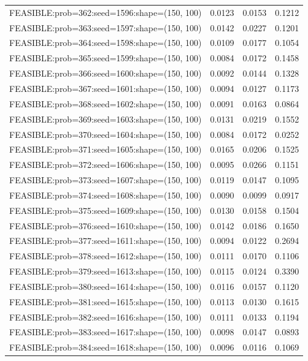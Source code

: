 \begin{longtable}{lccc}
FEASIBLE:prob=362:seed=1596:shape=(150, 100) & 0.0123 & 0.0153 & 0.1212 \\
FEASIBLE:prob=363:seed=1597:shape=(150, 100) & 0.0142 & 0.0227 & 0.1201 \\
FEASIBLE:prob=364:seed=1598:shape=(150, 100) & 0.0109 & 0.0177 & 0.1054 \\
FEASIBLE:prob=365:seed=1599:shape=(150, 100) & 0.0084 & 0.0172 & 0.1458 \\
FEASIBLE:prob=366:seed=1600:shape=(150, 100) & 0.0092 & 0.0144 & 0.1328 \\
FEASIBLE:prob=367:seed=1601:shape=(150, 100) & 0.0094 & 0.0127 & 0.1173 \\
FEASIBLE:prob=368:seed=1602:shape=(150, 100) & 0.0091 & 0.0163 & 0.0864 \\
FEASIBLE:prob=369:seed=1603:shape=(150, 100) & 0.0131 & 0.0219 & 0.1552 \\
FEASIBLE:prob=370:seed=1604:shape=(150, 100) & 0.0084 & 0.0172 & 0.0252 \\
FEASIBLE:prob=371:seed=1605:shape=(150, 100) & 0.0165 & 0.0206 & 0.1525 \\
FEASIBLE:prob=372:seed=1606:shape=(150, 100) & 0.0095 & 0.0266 & 0.1151 \\
FEASIBLE:prob=373:seed=1607:shape=(150, 100) & 0.0119 & 0.0147 & 0.1095 \\
FEASIBLE:prob=374:seed=1608:shape=(150, 100) & 0.0090 & 0.0099 & 0.0917 \\
FEASIBLE:prob=375:seed=1609:shape=(150, 100) & 0.0130 & 0.0158 & 0.1504 \\
FEASIBLE:prob=376:seed=1610:shape=(150, 100) & 0.0142 & 0.0186 & 0.1650 \\
FEASIBLE:prob=377:seed=1611:shape=(150, 100) & 0.0094 & 0.0122 & 0.2694 \\
FEASIBLE:prob=378:seed=1612:shape=(150, 100) & 0.0111 & 0.0170 & 0.1106 \\
FEASIBLE:prob=379:seed=1613:shape=(150, 100) & 0.0115 & 0.0124 & 0.3390 \\
FEASIBLE:prob=380:seed=1614:shape=(150, 100) & 0.0116 & 0.0157 & 0.1120 \\
FEASIBLE:prob=381:seed=1615:shape=(150, 100) & 0.0113 & 0.0130 & 0.1615 \\
FEASIBLE:prob=382:seed=1616:shape=(150, 100) & 0.0111 & 0.0133 & 0.1194 \\
FEASIBLE:prob=383:seed=1617:shape=(150, 100) & 0.0098 & 0.0147 & 0.0893 \\
FEASIBLE:prob=384:seed=1618:shape=(150, 100) & 0.0096 & 0.0116 & 0.1069 \\

\end{longtable}
